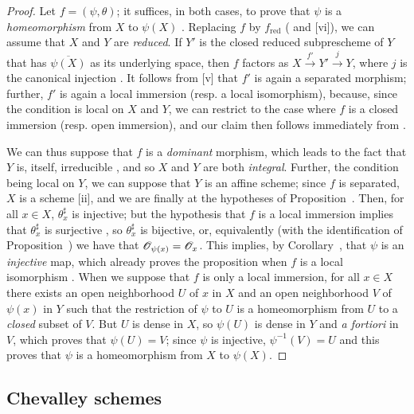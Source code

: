 \begin{proof}
Let $f=(\psi,\theta)$;
it suffices, in both cases, to prove that $\psi$ is a \emph{homeomorphism} from $X$ to $\psi(X)$ .
Replacing $f$ by $f_\text{red}$ ( and [vi]), we can assume that $X$ and $Y$ are \emph{reduced}.
If $Y'$ is the closed reduced subprescheme of $Y$ that has $\overline{\psi(X)}$ as its underlying space, then $f$ factors as $X\xrightarrow{f'}Y'\xrightarrow{j}Y$, where $j$ is the canonical injection .
It follows from [v] that $f'$ is again a separated morphism; further, $f'$ is again
a local immersion (resp. a local isomorphism), because, since the condition is local on $X$ and $Y$, we can restrict to the case where $f$ is a closed immersion (resp. open immersion), and our claim then follows immediately from .

We can thus suppose that $f$ is a \emph{dominant} morphism, which leads to the fact that $Y$ is, itself, irreducible , and so $X$ and $Y$ are both \emph{integral}.
Further, the condition being local on $Y$, we can suppose that $Y$ is an affine scheme;
since $f$ is separated, $X$ is a scheme [ii], and we are finally at the hypotheses of Proposition~.
Then, for all $x\in X$, $\theta_x^\sharp$ is injective;
but the hypothesis that $f$ is a local immersion implies that $\theta_x^\sharp$ is surjective , so $\theta_x^\sharp$ is bijective, or, equivalently (with the identification of Proposition~) we have that $\mathscr{O}_{\psi(x)}=\mathscr{O}_x$.
This implies, by Corollary~, that $\psi$ is an \emph{injective} map, which already proves the proposition when $f$ is a local isomorphism .
When we suppose that $f$ is only a local immersion, for all $x\in X$ there exists an open neighborhood $U$ of $x$ in $X$ and an open neighborhood $V$ of $\psi(x)$ in $Y$ such that the restriction of $\psi$ to $U$ is a homeomorphism from $U$ to a \emph{closed} subset of $V$.
But $U$ is dense in $X$, so $\psi(U)$ is dense in $Y$ and \emph{a fortiori} in $V$, which proves that $\psi(U)=V$;
since $\psi$ is injective, $\psi^{-1}(V)=U$ and this proves that $\psi$ is a homeomorphism from $X$ to $\psi(X)$.
\end{proof}

\subsection{Chevalley schemes}
\label{subsection:I.8.3}


